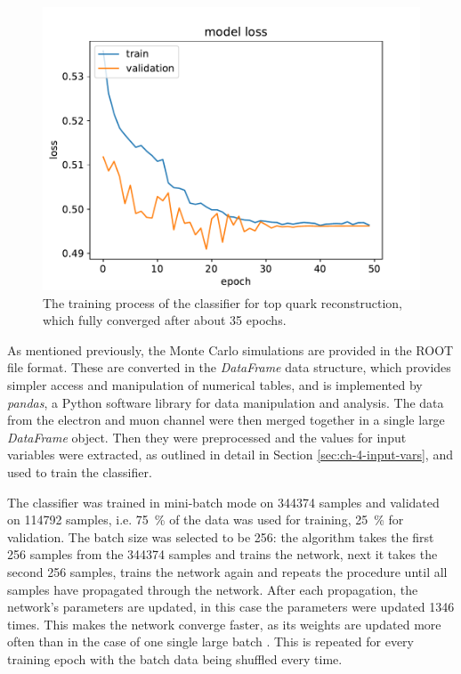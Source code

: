 \begin{figure}[h]
    \centering
    \includegraphics[scale=.75]{assets/chap04/model_loss.pdf}
    \caption{The training process of the classifier for top quark reconstruction, which fully converged after about 35 epochs.}
    \label{fig:ch_4_loss}
\end{figure}

As mentioned previously, the Monte Carlo simulations are provided in the ROOT file format. These are converted in the \emph{DataFrame} data structure, which provides simpler access and manipulation of numerical tables, and is implemented by \emph{pandas}, a Python software library for data manipulation and analysis. The data from the electron and muon channel were then merged together in a single large \emph{DataFrame} object. Then they were preprocessed and the values for input variables were extracted, as outlined in detail in Section \ref{sec:ch-4-input-vars}, and used to train the classifier.

The classifier was trained in mini-batch mode on \num{344374} samples and validated on \num{114792} samples, i.e. \SI{75}{\%} of the data was used for training, \SI{25}{\%} for validation. The batch size was selected to be 256: the algorithm takes the first 256 samples from the \num{344374} samples and trains the network, next it takes the second 256 samples, trains the network again and repeats the procedure until all samples have propagated through the network. After each propagation, the network's parameters are updated, in this case the parameters were updated \num{1346} times. This makes the network converge faster, as its weights are updated more often than in the case of one single large batch \cite{153535}. This is repeated for every training epoch with the batch data being shuffled every time.

